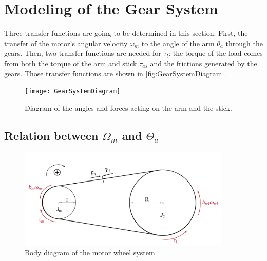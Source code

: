 
\graphicspath{{figures/modeling/gearTrain/}}
\section{Modeling of the Gear System}\label{sec:ModGearSys}
Three transfer functions are going to be determined in this section. First, the transfer of the motor's angular velocity $\omega_m$ to the angle of the arm $\theta_a$ through the gears. Then, two transfer functions are needed for $\tau_l$: the torque of the load comes from both the torque of the arm and stick $\tau_{as}$ and the frictions generated by the gears. Those transfer functions are shown in \autoref{fig:GearSystemDiagram}.
\begin{figure}[htbp]
	\centering
	\texttt{[image: GearSystemDiagram]}
	\caption{Diagram of the angles and forces acting on the arm and the stick.}
	\label{fig:GearSystemDiagram}
\end{figure}

\startexplain
{}
\stopexplain


\subsection{Relation between $\Omega_m$ and $\Theta_a$}

\begin{figure}[htbp]
	\centering
	\includegraphics[width=0.9\textwidth]{figures/modeling/gearTrain/GearAndBeltSystem.pdf}
	\caption{Body diagram of the motor wheel system}
	\label{fig:Belt&Pulley}
\end{figure}

\startexplain
{}
\stopexplain


